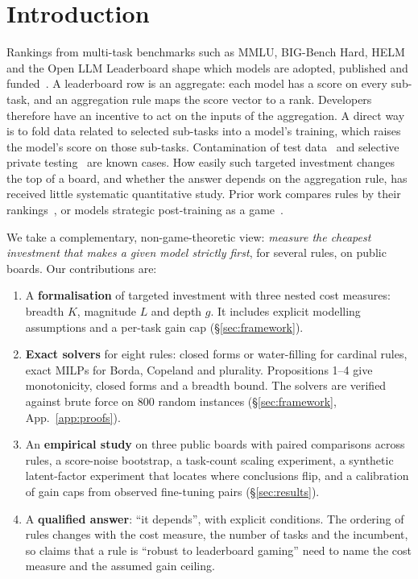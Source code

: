 \documentclass{article}
\theoremstyle{remark}
\begin{document}
\section{Introduction}
Rankings from multi-task benchmarks such as MMLU, BIG-Bench Hard, HELM and the Open LLM Leaderboard shape which models are adopted, published and funded~\citep{hendrycks2021mmlu,suzgun2023bbh,liang2022helm}. A leaderboard row is an aggregate: each model has a score on every sub-task, and an aggregation rule maps the score vector to a rank. Developers therefore have an incentive to act on the inputs of the aggregation. A direct way is to fold data related to selected sub-tasks into a model's training, which raises the model's score on those sub-tasks. Contamination of test data~\citep{zhou2023cheater,yang2023rephrased} and selective private testing~\citep{singh2025illusion} are known cases. How easily such targeted investment changes the top of a board, and whether the answer depends on the aggregation rule, has received little systematic quantitative study. Prior work compares rules by their rankings~\citep{dehghani2021lottery,lanctot2023social}, or models strategic post-training as a game~\citep{chen2026incentives}.

We take a complementary, non-game-theoretic view: \emph{measure the cheapest investment that makes a given model strictly first}, for several rules, on public boards. Our contributions are:
\begin{enumerate}
\item A \textbf{formalisation} of targeted investment with three nested cost measures: breadth $K$, magnitude $L$ and depth $g$. It includes explicit modelling assumptions and a per-task gain cap (\S\ref{sec:framework}).
\item \textbf{Exact solvers} for eight rules: closed forms or water-filling for cardinal rules, exact MILPs for Borda, Copeland and plurality. Propositions 1--4 give monotonicity, closed forms and a breadth bound. The solvers are verified against brute force on 800 random instances (\S\ref{sec:framework}, App.~\ref{app:proofs}).
\item An \textbf{empirical study} on three public boards with paired comparisons across rules, a score-noise bootstrap, a task-count scaling experiment, a synthetic latent-factor experiment that locates where conclusions flip, and a calibration of gain caps from observed fine-tuning pairs (\S\ref{sec:results}).
\item A \textbf{qualified answer}: ``it depends'', with explicit conditions. The ordering of rules changes with the cost measure, the number of tasks and the incumbent, so claims that a rule is ``robust to leaderboard gaming'' need to name the cost measure and the assumed gain ceiling.
\end{enumerate}
\end{document}
